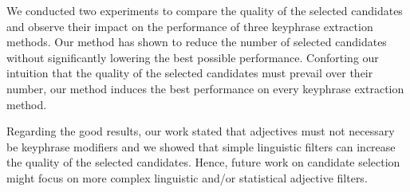   We conducted two experiments to compare the quality of the selected candidates
  and observe their impact on the performance of three keyphrase extraction
  methods. Our method has shown to reduce the number of selected candidates
  without significantly lowering the best possible performance. Conforting our
  intuition that the quality of the selected candidates must prevail over their
  number, our method induces the best performance on every keyphrase extraction
  method.

  Regarding the good results, our work stated that adjectives must not necessary
  be keyphrase modifiers and we showed that simple linguistic filters can
  increase the quality of the selected candidates. Hence, future work on
  candidate selection might focus on more complex linguistic and/or statistical
  adjective filters.

